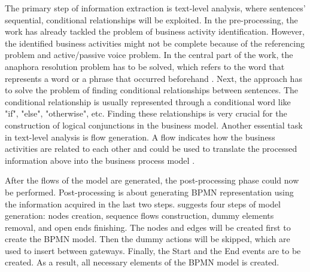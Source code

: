 The primary step of information extraction is text-level analysis, where sentences' sequential, conditional relationships will be exploited. In the pre-processing, the work has already tackled the problem of business activity identification. However, the identified business activities might not be complete because of the referencing problem and active/passive voice problem. In the central part of the work, the anaphora resolution problem has to be solved, which refers to the word that represents a word or a phrase that occurred beforehand \cite{literature_review_4}. Next, the approach has to solve the problem of finding conditional relationships between sentences. The conditional relationship is usually represented through a conditional word like "if", "else", "otherwise", etc. Finding these relationships is very crucial for the construction of logical conjunctions in the business model. Another essential task in text-level analysis is flow generation. A flow indicates how the business activities are related to each other and could be used to translate the processed information above into the business process model \cite{t2m_1}.


After the flows of the model are generated, the post-processing phase could now be performed. Post-processing is about generating BPMN representation using the information acquired in the last two steps. \cite{t2m_1} suggests four steps of model generation: nodes creation, sequence flows construction, dummy elements removal, and open ends finishing. The nodes and edges will be created first to create the BPMN model. Then the dummy actions will be skipped, which are used to insert between gateways. Finally, the Start and the End events are to be created. As a result, all necessary elements of the BPMN model is created. 
